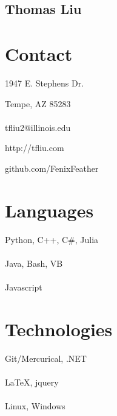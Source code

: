 \documentclass[letterpaper,10pt]{article}
\begin{document}
\pagestyle{empty}
\begin{center}\section*{ \fontsize{48}{16}\selectfont Thomas Liu}\end{center}
\begin{minipage}[t][0em][t]{0.2\textwidth}
  \section*{\bf \huge Contact}
{\small 1947 E. Stephens Dr.

Tempe, AZ 85283\\
~\\
tfliu2@illinois.edu

http://tfliu.com

github.com/FenixFeather
}
  \section*{\huge Languages}
  \begin{flushleft}{\small
      Python, C++, C\#, Julia\\
      ~\\
Java, Bash, VB\\
      ~\\
Javascript
    }\end{flushleft}

\section*{\huge Technologies}
  \begin{flushleft}{\small
      Git/Mercurical, .NET\\
      ~\\
LaTeX, jquery\\
      ~\\
Linux, Windows
    }\end{flushleft}
\end{minipage}\hspace{0.5cm}
\end{document}
